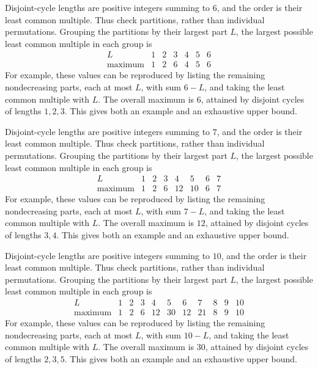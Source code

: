 \idea Disjoint-cycle lengths are positive integers summing to $6$, and the order is their least common multiple. Thus check partitions, rather than individual permutations.
Grouping the partitions by their largest part $L$, the largest possible least common multiple in each group is\[\begin{array}{c|rrrrrr}L&1&2&3&4&5&6\\\hline \text{maximum}&1&2&6&4&5&6\end{array}\]For example, these values can be reproduced by listing the remaining nondecreasing parts, each at most $L$, with sum $6-L$, and taking the least common multiple with $L$. The overall maximum is $6$, attained by disjoint cycles of lengths $1,2,3$. This gives both an example and an exhaustive upper bound.

\idea Disjoint-cycle lengths are positive integers summing to $7$, and the order is their least common multiple. Thus check partitions, rather than individual permutations.
Grouping the partitions by their largest part $L$, the largest possible least common multiple in each group is\[\begin{array}{c|rrrrrrr}L&1&2&3&4&5&6&7\\\hline \text{maximum}&1&2&6&12&10&6&7\end{array}\]For example, these values can be reproduced by listing the remaining nondecreasing parts, each at most $L$, with sum $7-L$, and taking the least common multiple with $L$. The overall maximum is $12$, attained by disjoint cycles of lengths $3,4$. This gives both an example and an exhaustive upper bound.

\idea Disjoint-cycle lengths are positive integers summing to $10$, and the order is their least common multiple. Thus check partitions, rather than individual permutations.
Grouping the partitions by their largest part $L$, the largest possible least common multiple in each group is\[\begin{array}{c|rrrrrrrrrr}L&1&2&3&4&5&6&7&8&9&10\\\hline \text{maximum}&1&2&6&12&30&12&21&8&9&10\end{array}\]For example, these values can be reproduced by listing the remaining nondecreasing parts, each at most $L$, with sum $10-L$, and taking the least common multiple with $L$. The overall maximum is $30$, attained by disjoint cycles of lengths $2,3,5$. This gives both an example and an exhaustive upper bound.

